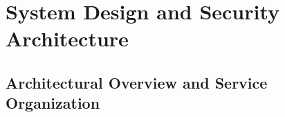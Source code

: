 
\chapter{System Design and Security Architecture}\label{section:architecture}


\section{Architectural Overview and Service Organization}\label{section:arch-overview}

